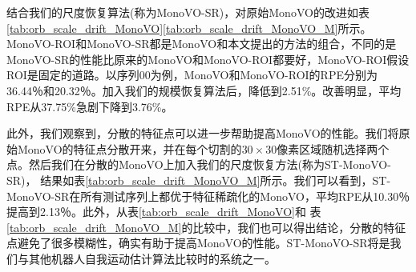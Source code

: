 \begin{table}[h]
    \caption{Improvement on MonoVO}
    \label{tab:orb_scale_drift_MonoVO}
\begin{center}
\end{center}
\end{table}

结合我们的尺度恢复算法(称为MonoVO-SR)，对原始MonoVO的改进如表\ref{tab:orb_scale_drift_MonoVO}\ref{tab:orb_scale_drift_MonoVO_M}所示。MonoVO-ROI和MonoVO-SR都是MonoVO和本文提出的方法的组合，不同的是MonoVO-SR的性能比原来的MonoVO和MonoVO-ROI都要好，MonoVO-ROI假设ROI是固定的道路。以序列00为例，MonoVO和MonoVO-ROI的RPE分别为36.44％和20.32％。加入我们的规模恢复算法后，降低到2.51\%。改善明显，平均RPE从37.75\%急剧下降到3.76\%。

此外，我们观察到，分散的特征点可以进一步帮助提高MonoVO的性能。我们将原始MonoVO的特征点分散开来，并在每个切割的$30\times30$像素区域随机选择两个点。然后我们在分散的MonoVO上加入我们的尺度恢复方法(称为ST-MonoVO-SR)，
结果如表\ref{tab:orb_scale_drift_MonoVO_M}所示。我们可以看到，ST-MonoVO-SR在所有测试序列上都优于特征稀疏化的MonoVO，平均RPE从10.30％提高到2.13％。此外，从表\ref{tab:orb_scale_drift_MonoVO}和
表\ref{tab:orb_scale_drift_MonoVO_M}的比较中，我们也可以得出结论，分散的特征点避免了很多模糊性，确实有助于提高MonoVO的性能。ST-MonoVO-SR将是我们与其他机器人自我运动估计算法比较时的系统之一。

